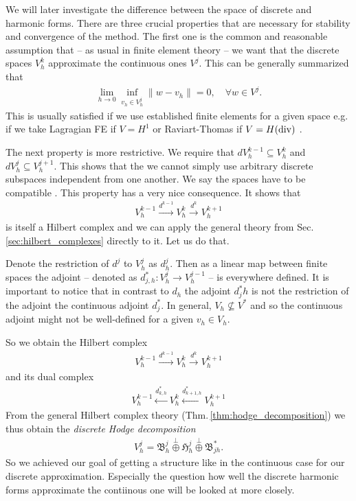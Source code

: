 \documentclass[../master_thesis.tex]{subfiles}
\begin{document}
We will later investigate the difference between the space of discrete and 
harmonic forms.
There are three crucial properties that are necessary for stability and convergence 
of the method. The first one is the common and reasonable assumption that 
-- as usual in finite element theory -- we want that the discrete spaces $V_h^k$
approximate the continuous ones $V^j$. This can be generally summarized that 
\begin{align*}
    \lim_{h \rightarrow 0} \inf_{v_h \in V_h^j} \lVert w - v_h \rVert = 0, \quad \forall w \in V^j.
\end{align*}
This is usually satisfied if we use established finite elements for a given space 
e.g. if we take Lagragian FE if $V = H^1$ or Raviart-Thomas if $V=H(\operatorname{div})$ \cite{}.

The next property is more restrictive. We require that $dV_h^{k-1} \subseteq V_h^k$ 
and $dV_h^j \subseteq V_h^{j+1}$. This shows that the we cannot simply use arbitrary 
discrete subspaces independent from one another. We say the spaces have to be 
compatible \cite{}. This property has a very nice
consequence. 
It shows that 
\begin{align*}
    V_h^{k-1} \xrightarrow{d^{k-1}} V_h^k \xrightarrow{d^k} V_h^{k+1}
\end{align*}
is itself a Hilbert complex and we can apply the general theory from 
Sec. \ref{sec:hilbert_complexes} directly to it. Let us do that.

Denote the restriction of $d^j$ to $V_h^j$ as $d_h^j$. Then as a linear map 
between finite spaces the adjoint -- denoted as $d_{j,h}^*: V_h^j \rightarrow V_h^{j-1}$ -- 
is everywhere defined. It is important to notice that in contrast to $d_h$ 
the adjoint $d^*_jh$ is not the restriction of the adjoint the continuous adjoint $d^*_j$.
In general, $V_h \not\subseteq V^*$ and so the continuous adjoint might not be 
well-defined for a given $v_h \in V_h$. 

So we obtain the Hilbert complex
\begin{align*}
    V_h^{k-1} \xrightarrow{d^{k-1}} V_h^{k} \xrightarrow{d^{k}} V_h^{k+1}
\end{align*}
and its dual complex
\begin{align*}
    V_h^{k-1} \xleftarrow{d^*_{k,h}} V_h^{k} \xleftarrow{d^*_{k+1,h}} V_h^{k+1}
\end{align*}
From the general Hilbert complex theory (Thm.\,\ref{thm:hodge_decomposition})
we thus obtain the \textit{discrete Hodge decomposition}
\begin{align*}
    V_h^j = \mathfrak{B}^j_h \stackrel{\perp}{\oplus} \mathfrak{H}^j_h \stackrel{\perp}{\oplus}
        \mathfrak{B}^*_{jh}.
\end{align*}
So we achieved our goal of getting a structure like in the continuous case 
for our discrete approximation. Especially the question how well the discrete harmonic 
forms approximate the contiinous one will be looked at more closely.
\end{document}
